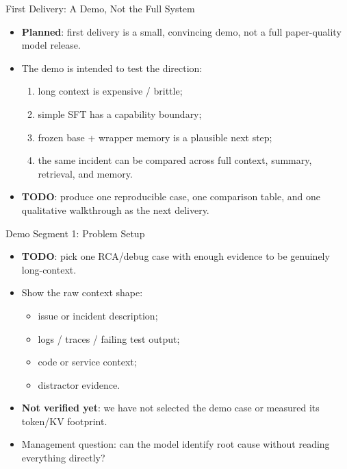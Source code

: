 \begin{frame}{First Delivery: A Demo, Not the Full System}
  \begin{itemize}
    \item \textbf{Planned}: first delivery is a small, convincing demo, not a full paper-quality model release.
    \item The demo is intended to test the direction:
      \begin{enumerate}
        \item long context is expensive / brittle;
        \item simple SFT has a capability boundary;
        \item frozen base + wrapper memory is a plausible next step;
        \item the same incident can be compared across full context, summary, retrieval, and memory.
      \end{enumerate}
    \item \textbf{TODO}: produce one reproducible case, one comparison table, and one qualitative walkthrough as the next delivery.
  \end{itemize}
\end{frame}

\begin{frame}{Demo Segment 1: Problem Setup}
  \begin{itemize}
    \item \textbf{TODO}: pick one RCA/debug case with enough evidence to be genuinely long-context.
    \item Show the raw context shape:
      \begin{itemize}
        \item issue or incident description;
        \item logs / traces / failing test output;
        \item code or service context;
        \item distractor evidence.
      \end{itemize}
    \item \textbf{Not verified yet}: we have not selected the demo case or measured its token/KV footprint.
    \item Management question: can the model identify root cause without reading everything directly?
  \end{itemize}
\end{frame}

